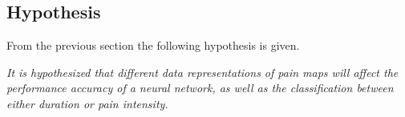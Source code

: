 \subsection{Hypothesis}
From the previous section the following hypothesis is given.

\noindent
\textit{It is hypothesized that different data representations of pain maps will affect the performance accuracy of a neural network, as well as the classification between either duration or pain intensity.}
  

